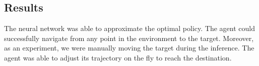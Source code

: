 \subsection{Results}\label{subsec:pathfinder_results}
The neural network was able to approximate the optimal policy.
The agent could successfully navigate from any point in the environment to the target.
Moreover, as an experiment, we were manually moving the target during the inference.
The agent was able to adjust its trajectory on the fly to reach the destination. 